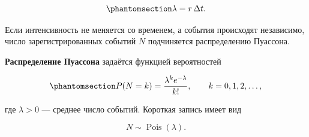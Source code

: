 \documentclass[
  russian,
  11pt,
  a4paper,
  open=any]{scrbook}
\begin{document}
\begin{equation}\protect\phantomsection\label{eq-poisson-mean-rate}{
\lambda=r\,\Delta t.
}\end{equation}

Если интенсивность не меняется со временем, а события происходят
независимо, число зарегистрированных событий \(N\) подчиняется
распределению Пуассона.

\begin{booknote}

\textbf{Распределение Пуассона} задаётся функцией вероятностей

\begin{equation}\protect\phantomsection\label{eq-poisson-pmf}{
P(N=k)=\frac{\lambda^k e^{-\lambda}}{k!},
\qquad k=0,1,2,\ldots,
}\end{equation}

где \(\lambda>0\) --- среднее число событий. Короткая запись имеет вид

\[
N\sim\operatorname{Pois}(\lambda).
\]

\end{booknote}
\end{document}
